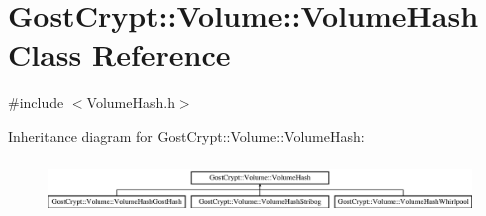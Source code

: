 \hypertarget{class_gost_crypt_1_1_volume_1_1_volume_hash}{}\section{Gost\+Crypt\+:\+:Volume\+:\+:Volume\+Hash Class Reference}
\label{class_gost_crypt_1_1_volume_1_1_volume_hash}


{\ttfamily \#include $<$Volume\+Hash.\+h$>$}

Inheritance diagram for Gost\+Crypt\+:\+:Volume\+:\+:Volume\+Hash\+:\begin{figure}[H]
\begin{center}
\leavevmode
\includegraphics[height=1.464052cm]{class_gost_crypt_1_1_volume_1_1_volume_hash}
\end{center}
\end{figure}
